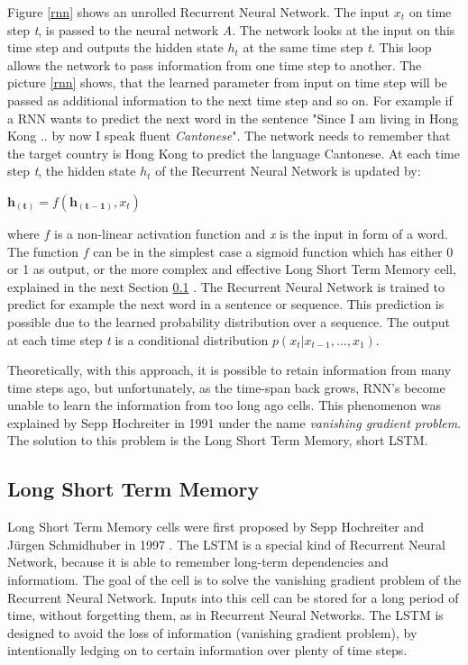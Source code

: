 Figure \ref{rnn} shows an unrolled Recurrent Neural Network. The input \(x_t\) on time step \textit{t}, is passed to the neural network \textit{A}. The network looks at the input on this time step and outputs the hidden state \(h_t\) at the same time step \textit{t}. This loop allows the network to pass information from one time step to another. The picture \ref{rnn} shows, that the learned parameter from input  on time step  will be passed as additional information to the next time step  and so on. For example if a RNN wants to predict the next word in the sentence "Since I am living in Hong Kong .. by now I speak fluent \textit{Cantonese}". The network needs to remember that the target country is Hong Kong to predict the language Cantonese. At each time step \textit{t}, the hidden state \textit{\(h_t\)} of the Recurrent Neural Network is updated by:

\begin{center}
	\begin{math}
	\boldsymbol{h_{(t)}} = f(\boldsymbol{h_{(t-1)}}, x_{t})
	\end{math}
\end{center}

where \(f\) is a non-linear activation function and \textit{x} is the input in form of a word. The function \(f\) can be in the simplest case a sigmoid function which has either 0 or 1 as output, or the more complex and effective Long Short Term Memory cell, explained in the next Section \ref{ss:lstm} \cite{hochreiter1997long}. The Recurrent Neural Network is trained to predict for example the next word in a sentence or sequence. This prediction is possible due to the learned probability distribution over a sequence. The output at each time step \textit{t} is a conditional distribution \(p(x_{t}|x_{t-1},...,x_{1})\).

Theoretically, with this approach, it is possible to retain information from many time steps ago, but unfortunately, as the time-span back grows, RNN's become unable to learn the information from too long ago cells. This phenomenon was explained by Sepp Hochreiter in 1991 \cite{Hochreiter:91} under the name \textit{vanishing gradient problem}. The solution to this problem is the Long Short Term Memory, short LSTM.

\subsection{Long Short Term Memory}\label{ss:lstm}
Long Short Term Memory cells were first proposed by Sepp Hochreiter and Jürgen Schmidhuber in 1997 \cite{hochreiter1997long}. The LSTM is a special kind of Recurrent Neural Network, because it is able to remember long-term dependencies and informatiom. The goal of the cell is to solve the vanishing gradient problem of the Recurrent Neural Network. Inputs into this cell can be stored for a long period of time, without forgetting them, as in Recurrent Neural Networks. The LSTM is designed to avoid the loss of information (vanishing gradient problem), by intentionally ledging on to certain information over plenty of time steps. 

